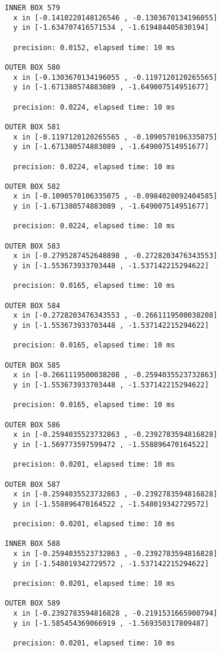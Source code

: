 \begin{verbatim}
INNER BOX 579
  x in [-0.1410220148126546 , -0.1303670134196055]
  y in [-1.634707416571534 , -1.619484405830194]

  precision: 0.0152, elapsed time: 10 ms

OUTER BOX 580
  x in [-0.1303670134196055 , -0.1197120120265565]
  y in [-1.671380574883089 , -1.649007514951677]

  precision: 0.0224, elapsed time: 10 ms

OUTER BOX 581
  x in [-0.1197120120265565 , -0.1090570106335075]
  y in [-1.671380574883089 , -1.649007514951677]

  precision: 0.0224, elapsed time: 10 ms

OUTER BOX 582
  x in [-0.1090570106335075 , -0.0984020092404585]
  y in [-1.671380574883089 , -1.649007514951677]

  precision: 0.0224, elapsed time: 10 ms

OUTER BOX 583
  x in [-0.2795287452648898 , -0.2728203476343553]
  y in [-1.553673933703448 , -1.537142215294622]

  precision: 0.0165, elapsed time: 10 ms

OUTER BOX 584
  x in [-0.2728203476343553 , -0.2661119500038208]
  y in [-1.553673933703448 , -1.537142215294622]

  precision: 0.0165, elapsed time: 10 ms

OUTER BOX 585
  x in [-0.2661119500038208 , -0.2594035523732863]
  y in [-1.553673933703448 , -1.537142215294622]

  precision: 0.0165, elapsed time: 10 ms

OUTER BOX 586
  x in [-0.2594035523732863 , -0.2392783594816828]
  y in [-1.569773597599472 , -1.558896470164522]

  precision: 0.0201, elapsed time: 10 ms

OUTER BOX 587
  x in [-0.2594035523732863 , -0.2392783594816828]
  y in [-1.558896470164522 , -1.548019342729572]

  precision: 0.0201, elapsed time: 10 ms

INNER BOX 588
  x in [-0.2594035523732863 , -0.2392783594816828]
  y in [-1.548019342729572 , -1.537142215294622]

  precision: 0.0201, elapsed time: 10 ms

OUTER BOX 589
  x in [-0.2392783594816828 , -0.2191531665900794]
  y in [-1.585454369066919 , -1.569350317809487]

  precision: 0.0201, elapsed time: 10 ms


\end{verbatim}
